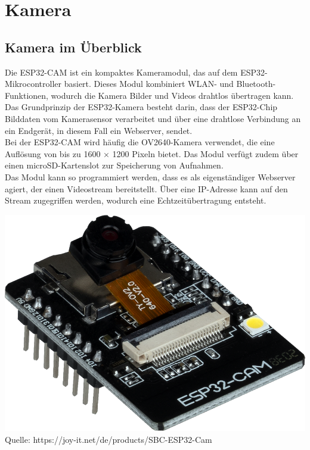 \documentclass[ngerman,12pt,a4paper]{article}
\begin{document}
	\newpage
	\section{Kamera}
	
		\subsection{Kamera im Überblick} %
		Die ESP32-CAM ist ein kompaktes Kameramodul, das auf dem ESP32-Mikrocontroller basiert. Dieses Modul kombiniert WLAN- und Bluetooth-Funktionen, wodurch die Kamera Bilder und Videos drahtlos übertragen kann. Das Grundprinzip der ESP32-Kamera besteht darin, dass der ESP32-Chip Bilddaten vom Kamerasensor verarbeitet und über eine drahtlose Verbindung an ein Endgerät, in diesem Fall ein Webserver, sendet. \\[0.5cm]
		Bei der ESP32-CAM wird häufig die OV2640-Kamera verwendet, die eine Auflösung von bis zu 1600 × 1200 Pixeln bietet. Das Modul verfügt zudem über einen microSD-Kartenslot zur Speicherung von Aufnahmen.\\[0.5cm]
		Das Modul kann so programmiert werden, dass es als eigenständiger Webserver agiert, der einen Videostream bereitstellt. Über eine IP-Adresse kann auf den Stream zugegriffen werden, wodurch eine Echtzeitübertragung entsteht. 
		\begin{center}
			\begin{minipage}{0.9\textwidth}
				\centering
				\includegraphics[width=\textwidth]{Pictures/esp32_cam}
				\label{fig:esp32_cam}
				\vspace{5pt}
				{\small Quelle: {https://joy-it.net/de/products/SBC-ESP32-Cam}}
			\end{minipage}
		\end{center}
		\newpage \noindent
\end{document}
